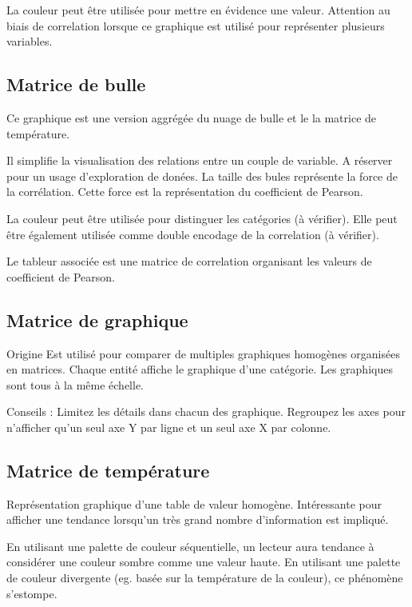 \documentclass[a4paper,12pt]{article}
\begin{document}
\begin{multicols}{2}
La couleur peut être utilisée pour mettre en évidence une valeur. \autocite{jonathanschwabishComparingCategories2021} Attention au biais de correlation lorsque ce graphique est utilisé pour représenter plusieurs variables. \autocite{jonathanschwabishComparingCategories2021}
\subsection*{Matrice de bulle}
\label{sec:orgd8084cc}
Ce graphique est une version aggrégée du nuage de bulle et le la matrice de température.

Il simplifie la visualisation des relations entre un couple de variable. A réserver pour un usage d'exploration de donées. \autocite{sosulskiGraphics2019} La taille des bules représente la force de la corrélation. Cette force est la représentation du coefficient de Pearson. \autocite{jonathanschwabishRelationship2021}

La couleur peut être utilisée pour distinguer les catégories (à vérifier). Elle peut être également utilisée comme double encodage de la correlation (à vérifier).

Le tableur associée est une matrice de correlation organisant les valeurs de coefficient de Pearson.
\subsection*{Matrice de graphique}
\label{sec:org9f8620b}
Origine
Est utilisé pour comparer de multiples graphiques homogènes organisées en matrices. Chaque entité affiche le graphique d'une catégorie. Les graphiques sont tous à la même échelle. \autocite{sosulskiGraphics2019}

Conseils : Limitez les détails dans chacun des graphique. \autocite{sosulskiGraphics2019} Regroupez les axes pour n'afficher qu'un seul axe Y par ligne et un seul axe X par colonne.
\subsection*{Matrice de température}
\label{sec:orgc7f4ff3}
Représentation graphique d'une table de valeur homogène. \autocite{sosulskiGraphics2019}
Intéressante pour afficher une tendance lorsqu'un très grand nombre d'information est impliqué.

En utilisant une palette de couleur séquentielle, un lecteur aura tendance à considérer une couleur sombre comme une valeur haute. En utilisant une palette de couleur divergente (eg. basée sur la température de la couleur), ce phénomène s'estompe.


\end{multicols}
\end{document}

